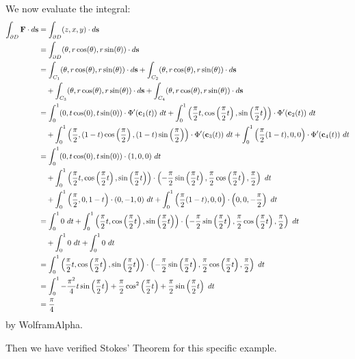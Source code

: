 \begin{solution}
    We now evaluate the integral:
    \begin{align*}
        \int_{\partial D} \vb{F} \cdot d\vb{s} &= \int_{\partial D} (z, x, y) \cdot d\vb{s} \\
        &= \int_{\partial D} (\theta, r\cos(\theta), r\sin(\theta)) \cdot d\vb{s} \\
        &= \int_{C_1} (\theta, r\cos(\theta), r\sin(\theta)) \cdot d\vb{s} + \int_{C_2} (\theta, r\cos(\theta), r\sin(\theta)) \cdot d\vb{s} \\
        &\quad + \int_{C_3} (\theta, r\cos(\theta), r\sin(\theta)) \cdot d\vb{s} + \int_{C_4} (\theta, r\cos(\theta), r\sin(\theta)) \cdot d\vb{s} \\
        &= \int_0^1 (0, t\cos(0), t\sin(0)) \cdot \Phi'(\vb{c}_1(t)) \ dt + \int_0^1 \left(\frac{\pi}{2}t, \cos\left(\frac{\pi}{2}t\right), \sin\left(\frac{\pi}{2}t\right)\right) \cdot \Phi'(\vb{c}_2(t)) \ dt \\
        &\quad + \int_0^1 \left(\frac{\pi}{2}, (1 - t)\cos\left(\frac{\pi}{2}\right), (1- t)\sin\left(\frac{\pi}{2}\right)\right) \cdot \Phi'(\vb{c}_3(t)) \ dt + \int_0^1 \left(\frac{\pi}{2}(1 - t), 0, 0\right) \cdot \Phi'(\vb{c}_4(t)) \ dt \\
        &= \int_0^1 (0, t\cos(0), t\sin(0)) \cdot (1, 0, 0) \ dt \\
        &\quad + \int_0^1 \left(\frac{\pi}{2}t, \cos\left(\frac{\pi}{2}t\right), \sin\left(\frac{\pi}{2}t\right)\right) \cdot \left(-\frac{\pi}{2}\sin\left(\frac{\pi}{2}t\right), \frac{\pi}{2}\cos\left(\frac{\pi}{2}t\right), \frac{\pi}{2}\right) \ dt \\
        &\quad + \int_0^1 \left(\frac{\pi}{2}, 0, 1- t\right) \cdot (0, -1, 0) \ dt + \int_0^1 \left(\frac{\pi}{2}(1 - t), 0, 0\right) \cdot \left(0, 0, -\frac{\pi}{2}\right) \ dt \\
        &= \int_0^1 0 \ dt + \int_0^1 \left(\frac{\pi}{2}t, \cos\left(\frac{\pi}{2}t\right), \sin\left(\frac{\pi}{2}t\right)\right) \cdot \left(-\frac{\pi}{2}\sin\left(\frac{\pi}{2}t\right), \frac{\pi}{2}\cos\left(\frac{\pi}{2}t\right), \frac{\pi}{2}\right) \ dt \\
        &\quad + \int_0^1 0 \ dt + \int_0^1 0 \ dt \\
        &= \int_0^1 \left(\frac{\pi}{2}t, \cos\left(\frac{\pi}{2}t\right), \sin\left(\frac{\pi}{2}t\right)\right) \cdot \left(-\frac{\pi}{2}\sin\left(\frac{\pi}{2}t\right), \frac{\pi}{2}\cos\left(\frac{\pi}{2}t\right), \frac{\pi}{2}\right) \ dt \\
        &= \int_0^1 -\frac{\pi^2}{4}t \sin\left(\frac{\pi}{2}t\right) +  \frac{\pi}{2}\cos^2\left(\frac{\pi}{2}t\right) + \frac{\pi}{2}\sin\left(\frac{\pi}{2}t\right) \ dt \\
        &= \frac{\pi}{4}
    \end{align*}
    by WolframAlpha.
    
    Then we have verified Stokes' Theorem for this specific example.
\end{solution}